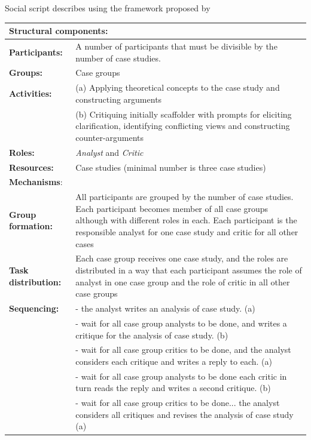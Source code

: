 \begin{quadro}[htb]
\caption{Social script describes using the framework proposed by  }
\label{qua:social-script-framework-kobbe}
\centering
\footnotesize
\begin{tabular}{l p{12cm}}
\toprule
\multicolumn{2}{l}{\textbf{Structural components:}} \\ \midrule
\textbf{Participants:} &
A number of participants that must be divisible by the number of case studies.  \\
\textbf{Groups:} &
Case groups \\
\textbf{Activities:} &
(a) Applying theoretical concepts to the case study and constructing arguments \\
 &
(b) Critiquing initially scaffolder with prompts for eliciting clarification, identifying conflicting views and constructing counter-arguments \\
\textbf{Roles:} &
\emph{Analyst} and \emph{Critic} \\
\textbf{Resources:} &
Case studies (minimal number is three case studies) \\
\toprule
\multicolumn{2}{l}{\textbf{Mechanisms}:} \\ \midrule
\textbf{Group formation:} &
All participants are grouped by the number of case studies. Each participant becomes member of all case groups although with different roles in each. Each participant is the responsible analyst for one case study and critic for all other cases \\
\textbf{Task distribution:} &
Each case group receives one case study, and the roles are distributed in a way that each participant assumes the role of analyst in one case group and the role of critic in all other case groups \\
\textbf{Sequencing:}
& - the analyst writes an analysis of case study. (a) \\
& - wait for all case group analysts to be done, and writes a critique for the analysis of case study. (b) \\
& - wait for all case group critics to be done, and the analyst considers each critique and writes a reply to each. (a) \\
& - wait for all case group analysts to be done each critic in turn reads the reply and writes a second critique. (b) \\
& - wait for all case group critics to be done... the analyst considers all critiques and revises the analysis of case study (a) \\
\bottomrule
\end{tabular}
\end{quadro}


